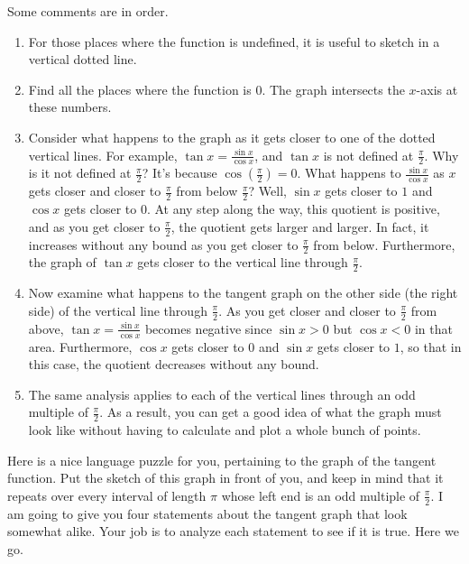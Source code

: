 \documentclass[english]{book}
\begin{document}
Some comments are in order.
\begin{enumerate}[\hspace{1cm}1)]
  \item For those places where the function is undefined, it is useful to sketch in a vertical dotted line.
  \item Find all the places where the function is $0$. The graph intersects the $x$-axis at these numbers.
  \item Consider what happens to the graph as it gets closer to one of the dotted vertical lines. For example, $\tan x = \frac{\sin x}{\cos x}$, and $\tan x$ is not defined at $\frac{\pi}{2}$. Why is it not defined at $\frac{\pi}{2}$? It's because $\cos (\frac{\pi}{2}) = 0$. What happens to $\frac{\sin x}{\cos x}$ as $x$ gets closer and closer to $\frac{\pi}{2}$ from below $\frac{\pi}{2}$? Well, $\sin x$ gets closer to $1$ and $\cos x$ gets closer to $0$. At any step along the way, this quotient is positive, and as you get closer to $\frac{\pi}{2}$, the quotient gets larger and larger. In fact, it increases without any bound as you get closer to $\frac{\pi}{2}$ from below. Furthermore, the graph of $\tan x$ gets closer to the vertical line through $\frac{\pi}{2}$.
  \item Now examine what happens to the tangent graph on the other side (the right side) of the vertical line through $\frac{\pi}{2}$. As you get closer and closer to $\frac{\pi}{2}$ from above, $\tan x = \frac{\sin x}{\cos x}$ becomes negative since $\sin x > 0$ but $\cos x < 0$ in that area. Furthermore, $\cos x$ gets closer to $0$ and $\sin x$ gets closer to $1$, so that in this case, the quotient decreases without any bound.
  \item The same analysis applies to each of the vertical lines through an odd multiple of $\frac{\pi}{2}$. As a result, you can get a good idea of what the graph must look like without having to calculate and plot a whole bunch of points. 
\end{enumerate}

Here is a nice language puzzle for you, pertaining to the graph of the tangent function. Put the sketch of this graph in front of you, and keep in mind that it repeats over every interval of length $\pi$ whose left end is an odd multiple of $\frac{\pi}{2}$. I am going to give you four statements about the tangent graph that look somewhat alike. Your job is to analyze each statement to see if it is true. Here we go.

\vfill
\end{document}
